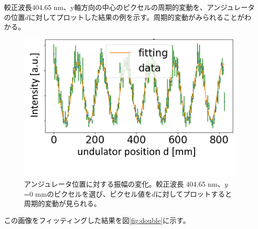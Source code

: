 \documentclass[a4paper,11pt,uplatex]{jsbook}
\begin{document}
較正波長404.65 nm、y軸方向の中心のピクセルの周期的変動を、アンジュレータの位置$d$に対してプロットした結果の例を示す。周期的変動がみられることがわかる。
\begin{figure}
  \centering
  \includegraphics[width=0.8\linewidth]{image/4-oscillation.png}
  \caption[アンジュレータ位置に対する振幅の変化]{アンジュレータ位置に対する振幅の変化。較正波長 404.65 nm、$y$ =0 mmのピクセルを選び、ピクセル値を$d$に対してプロットすると周期的変動が見られる。}
\end{figure}
この画像をフィッティングした結果を図\ref{fig:double}に示す。
\end{document}
